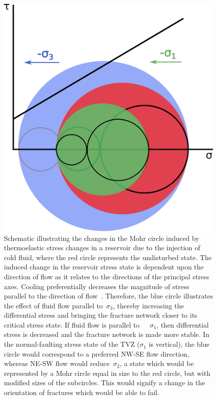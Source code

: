 \begin{figure}[h!]
\begin{center}
\includegraphics[width=0.42\columnwidth]{Chapter_1_Intro/figures/T_decrease_mohr/T_decrease_mohr_original}
\caption{{Schematic illustrating the changes in the Mohr circle induced by
thermoelastic stress changes in a reservoir due to the injection of cold
fluid, where the red circle represents the undisturbed state. The
induced change in the reservoir stress state is dependent upon the
direction of flow as it relates to the directions of the principal
stress axes. Cooling preferentially decreases the magnitude of stress
parallel to the direction of flow~\protect\citep{Jeanne_2014}. Therefore, the
blue circle illustrates the effect of fluid flow parallel
to~\(\sigma_{3}\), thereby increasing the differential stress and
bringing the fracture network closer to its critical stress state. If
fluid flow is parallel to~~~\(\sigma_{1} \), then differential stress
is decreased and the fracture network is made more stable. In the
normal-faulting stress state of the TVZ (\(\sigma_{1}\) is
vertical), the blue circle would correspond to a preferred NW-SE flow
direction, whereas NE-SW flow would reduce~\(\sigma_2\), a state
which would be represented by a Mohr circle equal in size to the red
circle, but with modified sizes of the subcircles. This would signify a
change in the orientation of fractures which would be able to fail.
{\label{621452}}%
}}
\end{center}
\end{figure}

